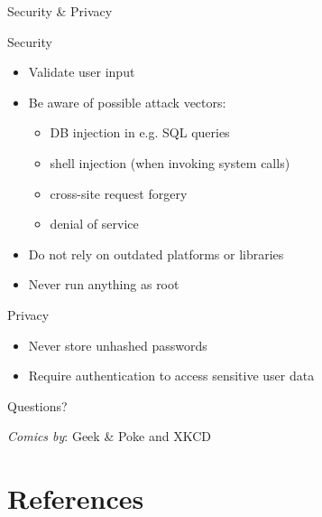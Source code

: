 \documentclass[compress]{beamer}
\begin{document}
\begin{frame}{Security \& Privacy}

    \begin{block}{Security}
        \begin{itemize}
            \item Validate user input
            \item Be aware of possible attack vectors:
            \begin{itemize}
                \item DB injection in e.g. SQL queries
                \item shell injection (when invoking system calls)
                \item cross-site request forgery
                \item denial of service
            \end{itemize}
            \item Do not rely on outdated platforms or libraries 
            \item Never run anything as root
        \end{itemize}
    \end{block}
    \begin{block}{Privacy}
        \begin{itemize}
            \item Never store unhashed passwords
            \item Require authentication to access sensitive user data
        \end{itemize}
    \end{block}

\end{frame}


\begin{frame}
\begin{center}

\Large{Questions?}

\vspace{1cm}

\emph{Comics by}: Geek \& Poke and XKCD


\end{center}

\end{frame}



\section{References}
\end{document}
